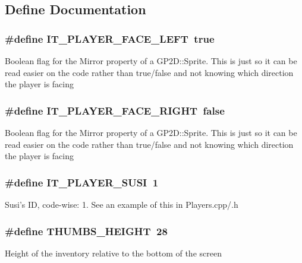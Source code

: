 \subsection{Define Documentation}
\subsubsection{\setlength{\rightskip}{0pt plus 5cm}\#define IT\_\-PLAYER\_\-FACE\_\-LEFT~true}\label{globals_8h_4c84f21a52a1f443f99171f15a756e35}


Boolean flag for the Mirror property of a GP2D::Sprite. This is just so it can be read easier on the code rather than true/false and not knowing which direction the player is facing 
\subsubsection{\setlength{\rightskip}{0pt plus 5cm}\#define IT\_\-PLAYER\_\-FACE\_\-RIGHT~false}\label{globals_8h_37ceb0d034894db890e9bd4f47760acc}


Boolean flag for the Mirror property of a GP2D::Sprite. This is just so it can be read easier on the code rather than true/false and not knowing which direction the player is facing 
\subsubsection{\setlength{\rightskip}{0pt plus 5cm}\#define IT\_\-PLAYER\_\-SUSI~1}\label{globals_8h_1da2d4ad7659310cbe68fb0f54a58cde}


Susi's ID, code-wise: 1. See an example of this in Players.cpp/.h 
\subsubsection{\setlength{\rightskip}{0pt plus 5cm}\#define THUMBS\_\-HEIGHT~28}\label{globals_8h_3278ea0ed112d2a99b5c7e215276adb8}


Height of the inventory relative to the bottom of the screen 
